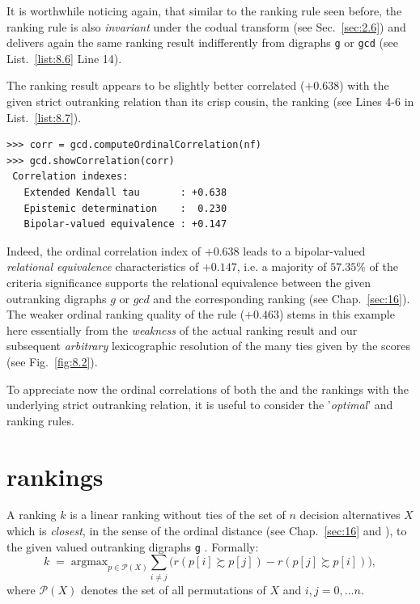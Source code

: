 It is worthwhile noticing again, that similar to the \Copeland ranking rule seen before, the \NetFlows ranking rule is also \emph{invariant} under the codual transform (see Sec.~\ref{sec:2.6}) and delivers again the same ranking result indifferently from digraphs \texttt{g} or \texttt{gcd} (see List.~\vref{list:8.6} Line 14). 

The \NetFlows ranking result appears to be slightly better correlated ($+0.638$) with the given strict outranking relation than its crisp cousin, the \Copeland ranking (see Lines 4-6 in List.~\vref{list:8.7}).
\begin{lstlisting}[caption={Checking the quality of the \NetFlows Ranking},label=list:8.7]   
>>> corr = gcd.computeOrdinalCorrelation(nf)
>>> gcd.showCorrelation(corr)
 Correlation indexes:
   Extended Kendall tau       : +0.638
   Epistemic determination    :  0.230
   Bipolar-valued equivalence : +0.147
\end{lstlisting}

Indeed, the ordinal correlation index of $+0.638$ leads to a bipolar-valued \emph{relational equivalence} characteristics of $+0.147$, i.e. a majority of $57.35\%$ of the criteria significance supports the relational equivalence between the given outranking digraphs $g$ or $gcd$  and the corresponding \NetFlows ranking (see Chap.~\ref{sec:16}). The weaker ordinal ranking quality of the \Copeland rule ($+0.463$) stems in this example here essentially from the \emph{weakness} of the actual \Copeland ranking result and our subsequent \emph{arbitrary} lexicographic resolution of the many ties given by the \Copeland scores (see Fig.~\vref{fig:8.2}).

To appreciate now the ordinal correlations of both the \Copeland and the \NetFlows rankings with the underlying strict outranking relation, it is useful to consider the '\emph{optimal}' \Kemeny and \Slater ranking rules.

\section{\Kemeny rankings}
\label{sec:8.4}

\begin{definition}\label{def:8.3}

  \noindent A \Kemeny ranking $k$ is a linear ranking without ties of the set of $n$ decision alternatives $X$ which is \emph{closest}, in the sense of the ordinal \Kendall distance (see Chap.~\ref{sec:16} and \citet{BIS-2012b}), to the given valued outranking digraphs \texttt{g} \citep{KEM-1959}. Formally:
  \begin{equation}\label{eq:8.1}
    k \;=\; \text{argmax}_{p \in \mathcal{P}(X)} \sum_{i \neq j}\big(r(p[i] \succsim p[j]) - r(p[j] \succsim p[i]) \big),
  \end{equation}
where $\mathcal{P}(X)$ denotes the set of all permutations of $X$ and $i,j = 0,... n$.
\end{definition}


